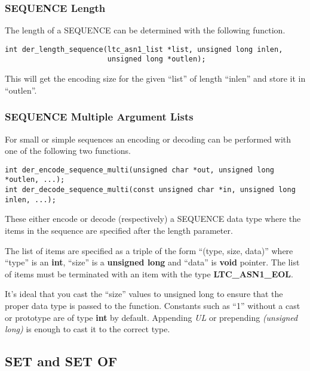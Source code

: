 \documentclass[a4paper]{book}
\begin{document}
\subsubsection{SEQUENCE Length}

The length of a SEQUENCE can be determined with the following function.

\begin{verbatim}
int der_length_sequence(ltc_asn1_list *list, unsigned long inlen,
                        unsigned long *outlen);
\end{verbatim}

This will get the encoding size for the given ``list'' of length ``inlen'' and store it in ``outlen''.  

\subsubsection{SEQUENCE Multiple Argument Lists}

For small or simple sequences an encoding or decoding can be performed with one of the following two functions.


\begin{verbatim}
int der_encode_sequence_multi(unsigned char *out, unsigned long *outlen, ...);
int der_decode_sequence_multi(const unsigned char *in, unsigned long inlen, ...);
\end{verbatim}

These either encode or decode (respectively) a SEQUENCE data type where the items in the sequence are specified after the length parameter.

The list of items are specified as a triple of the form ``(type, size, data)''  where ``type'' is an \textbf{int}, ``size'' is a \textbf{unsigned long}
and ``data'' is \textbf{void} pointer.  The list of items must be terminated with an item with the type \textbf{LTC\_ASN1\_EOL}.

It's ideal that you cast the ``size'' values to unsigned long to ensure that the proper data type is passed to the function.  Constants such as ``1'' without
a cast or prototype are of type \textbf{int} by default.  Appending \textit{UL} or prepending \textit{(unsigned long)} is enough to cast it to the correct type.

\subsection{SET and SET OF}
\end{document}
